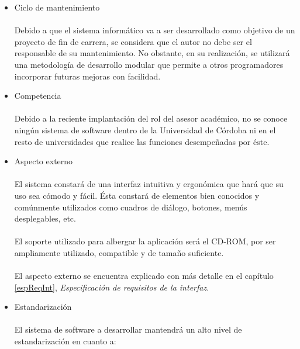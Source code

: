\begin{itemize}
 \item Ciclo de mantenimiento

   \paragraph{}Debido a que el sistema informático va a ser desarrollado como
   objetivo de un proyecto de fin de carrera, se considera que el autor no debe
   ser el responsable de su mantenimiento. No obstante, en su realización, se
   utilizará una metodología de desarrollo modular que permite a otros
   programadores incorporar futuras mejoras con facilidad.

 \item Competencia

   \paragraph{}Debido a la reciente implantación del rol del asesor académico,
   no se conoce ningún sistema de software dentro de la Universidad de Córdoba
   ni en el resto de universidades que realice las funciones desempeñadas por
   éste.

 \item Aspecto externo

   \paragraph{}El sistema constará de una interfaz intuitiva y ergonómica que
   hará que su uso sea cómodo y fácil. Ésta constará de elementos bien conocidos
   y comúnmente utilizados como cuadros de diálogo, botones, menús desplegables,
   etc.

   \paragraph{}El soporte utilizado para albergar la aplicación será el CD-ROM,
   por ser ampliamente utilizado, compatible y de tamaño suficiente.

   \paragraph{}El aspecto externo se encuentra explicado con más detalle en el
   capítulo \ref{espReqInt}, \textit{Especificación de requisitos de la
   interfaz}.

 \item Estandarización

   \paragraph{}El sistema de software a desarrollar mantendrá un alto nivel de
   estandarización en cuanto a:


\end{itemize}
